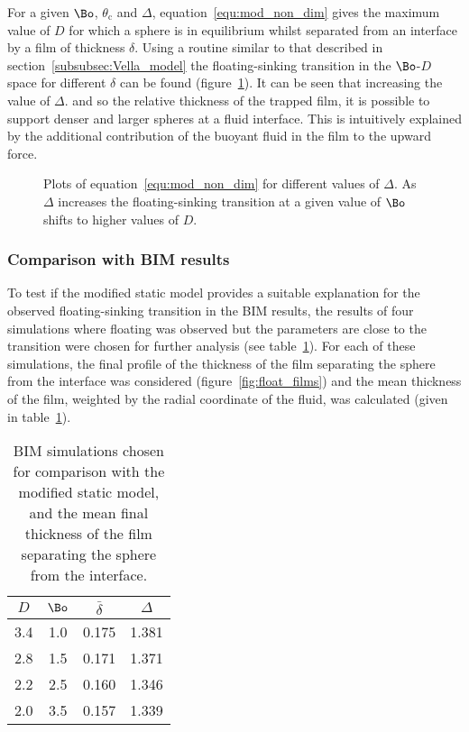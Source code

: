 {For a given $\Bo$, $\theta_{\text{c}}$ and $\Delta$, equation~\ref{equ:mod_non_dim} gives the maximum value of $D$ for which a sphere is in equilibrium whilst separated from an interface by a film of thickness $\delta$. Using a routine similar to that described in section~\ref{subsubsec:Vella_model} the floating-sinking transition in the $\Bo$-$D$ space for different $\delta$ can be found (figure~\ref{fig:Delta_trans}). It can be seen that increasing the value of $\Delta$. and so the relative thickness of the trapped film, it is possible to support denser and larger spheres at a fluid interface. This is intuitively explained by the additional contribution of the buoyant fluid in the film to the upward force.

  \begin{figure}
    \resizebox{0.9\textwidth}{!}{\large }
    \caption{Plots of equation~\ref{equ:mod_non_dim} for different values of $\Delta$. As $\Delta$ increases the floating-sinking transition at a given value of $\Bo$ shifts to higher values of $D$. \label{fig:Delta_trans}}
  \end{figure}

\subsubsection{Comparison with BIM results}
\label{subsubsection:mod_comp_bim}

To test if the modified static model provides a suitable explanation for the observed floating-sinking transition in the BIM results, the results of four simulations where floating was observed but the parameters are close to the transition were chosen for further analysis (see table~\ref{tab:film_sims}). For each of these simulations, the final profile of the thickness of the film separating the sphere from the interface was considered (figure~\ref{fig:float_films}) and the mean thickness of the film, weighted by the radial coordinate of the fluid, was calculated (given in table~\ref{tab:film_sims}).

\begin{longtable}{|c|c|c|c|}
  \caption{BIM simulations chosen for comparison with the modified static model, and the mean final thickness of the film separating the sphere from the interface. \label{tab:film_sims}} \\ %
  \hline
$D$ & $\Bo$ & $\bar{\delta}$ & $\Delta$ \\
  \hline %
  3.4 & 1.0 & 0.175 & 1.381 \\
  2.8 & 1.5 & 0.171 & 1.371 \\
  2.2 & 2.5 & 0.160 & 1.346 \\
  2.0 & 3.5 & 0.157 & 1.339 \\
  \hline
\end{longtable}

}
